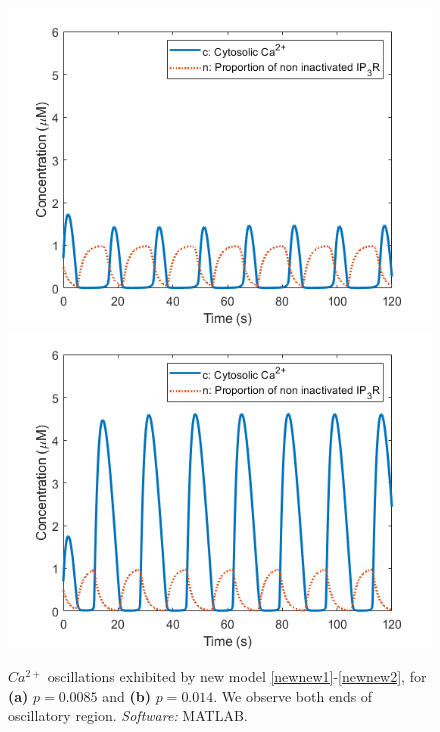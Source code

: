 \begin{figure}[!htb]
\centering
{}
  \includegraphics[width=\linewidth]{Chapters/5_New_Model/extras/p00085.png}
\endminipage\hfill\\
  \includegraphics[width=\linewidth]{Chapters/5_New_Model/extras/p0014.png}
\endminipage\hfill
\caption{$Ca^{2+}$ oscillations exhibited by new model \eqref{newnew1}-\eqref{newnew2}, for \textbf{(a)} $p=0.0085$ and \textbf{(b)} $p=0.014$. We observe both ends of oscillatory region. \textit{Software:} MATLAB.}\label{tdd}
\end{figure}

